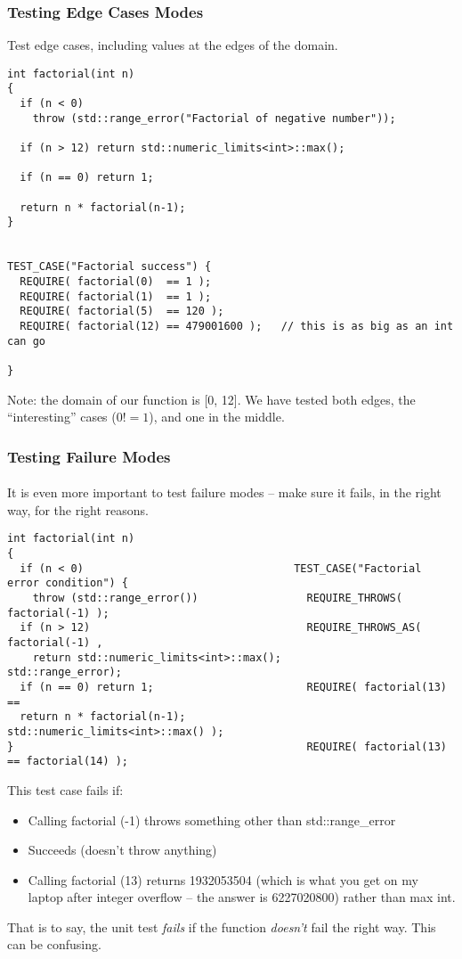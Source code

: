 \begin{frame}[fragile,t]
\frametitle{Testing Edge Cases Modes}
Test edge cases, including values at the edges of the domain.
{\scriptsize\begin{verbatim}
int factorial(int n)
{
  if (n < 0)
    throw (std::range_error("Factorial of negative number"));

  if (n > 12) return std::numeric_limits<int>::max();

  if (n == 0) return 1;

  return n * factorial(n-1);
}


TEST_CASE("Factorial success") {
  REQUIRE( factorial(0)  == 1 );
  REQUIRE( factorial(1)  == 1 );
  REQUIRE( factorial(5)  == 120 );
  REQUIRE( factorial(12) == 479001600 );   // this is as big as an int can go

}
\end{verbatim}}

Note: the domain of our function is [0, 12].  We have tested both
edges, the ``interesting'' cases ($0! = 1$), and one in the middle.

\end{frame}
\begin{frame}[fragile,t]
\frametitle{Testing Failure Modes}
\framesubtitle{}
It is even more important to test failure modes -- make sure it fails,
in the right way, for the right reasons.
{\scriptsize\begin{verbatim}
int factorial(int n)
{
  if (n < 0)                                 TEST_CASE("Factorial error condition") {    
    throw (std::range_error())                 REQUIRE_THROWS(    factorial(-1) );          
  if (n > 12)                                  REQUIRE_THROWS_AS( factorial(-1) ,        
    return std::numeric_limits<int>::max();                       std::range_error);                    
  if (n == 0) return 1;                        REQUIRE( factorial(13) ==                 
  return n * factorial(n-1);                         std::numeric_limits<int>::max() );  
}                                              REQUIRE( factorial(13) == factorial(14) );
\end{verbatim}}

This test case fails if:
\begin{itemize}
  \item Calling factorial (-1) throws something other than std::range\_error 
  \item Succeeds (doesn't throw anything) 
  \item Calling factorial (13) returns 1932053504 (which is what you get on my laptop after integer overflow -- 
  the answer is 6227020800) rather than max int.
\end{itemize}

That is to say, the unit test \emph{fails} if the function \emph{doesn't} fail the right way.  This can be confusing.

\end{frame}

